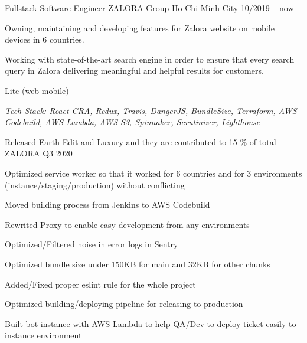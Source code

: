 

\begin{cventries}

  \cventry
    {Fullstack Software Engineer} %
    {ZALORA Group} %
    {Ho Chi Minh City} %
    {10/2019 -- now} %
    {
      \begin{cvitems} %
        \item {Owning, maintaining and developing features for Zalora website on mobile devices in 6 countries.}
        \item {Working with state-of-the-art search engine in order to ensure that every search query in Zalora delivering meaningful and helpful results for customers.}
      \end{cvitems}
    }
     \cventry
    {Lite (web mobile)} %
    {} %
    {} %
    {} %
    {
      \begin{cvitems} %
         \item[] {\it Tech Stack: React CRA, Redux, Travis, DangerJS, BundleSize, Terraform, AWS Codebuild, AWS Lambda, AWS S3, Spinnaker, Scrutinizer, Lighthouse}
        \item {Released Earth Edit and Luxury and they are contributed to 15 \% of total ZALORA Q3 2020}
        \item {Optimized service worker so that it worked for 6 countries and for 3 environments (instance/staging/production) without conflicting}
        \item {Moved building process from Jenkins to AWS Codebuild}
        \item {Rewrited Proxy to enable easy development from any environments}
        \item {Optimized/Filtered noise in error logs in Sentry}
        \item {Optimized bundle size under 150KB for main and 32KB for other chunks}
        \item {Added/Fixed proper eslint rule for the whole project}
        \item{Optimized building/deploying pipeline for releasing to production}
        \item {Built bot instance with AWS Lambda to help QA/Dev to deploy ticket easily to instance environment}
      \end{cvitems}
    }
    

\end{cventries}
